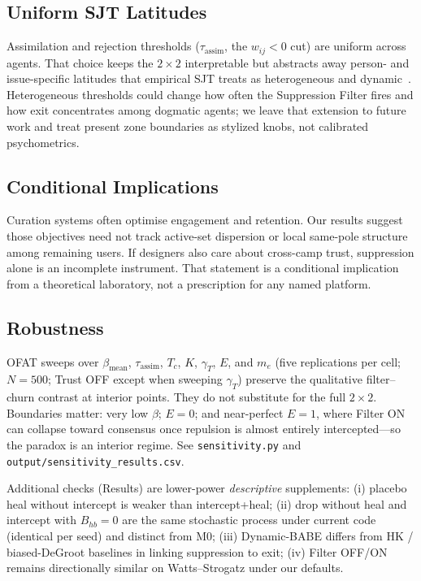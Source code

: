 \subsection{Uniform SJT Latitudes}
Assimilation and rejection thresholds ($\tau_{\mathrm{assim}}$, the $w_{ij}<0$ cut) are uniform across agents. That choice keeps the $2\times2$ interpretable but abstracts away person- and issue-specific latitudes that empirical SJT treats as heterogeneous and dynamic~\citep{Sherif1961}. Heterogeneous thresholds could change how often the Suppression Filter fires and how exit concentrates among dogmatic agents; we leave that extension to future work and treat present zone boundaries as stylized knobs, not calibrated psychometrics.

\subsection{Conditional Implications}
Curation systems often optimise engagement and retention. Our results suggest those objectives need not track active-set dispersion or local same-pole structure among remaining users. If designers also care about cross-camp trust, suppression alone is an incomplete instrument. That statement is a conditional implication from a theoretical laboratory, not a prescription for any named platform.

\subsection{Robustness}
OFAT sweeps over $\beta_{\mathrm{mean}}$, $\tau_{\mathrm{assim}}$, $T_c$, $K$, $\gamma_T$, $E$, and $m_e$ (five replications per cell; $N=500$; Trust OFF except when sweeping $\gamma_T$) preserve the qualitative filter--churn contrast at interior points. They do not substitute for the full $2\times2$. Boundaries matter: very low $\beta$; $E=0$; and near-perfect $E=1$, where Filter ON can collapse toward consensus once repulsion is almost entirely intercepted---so the paradox is an interior regime. See \texttt{sensitivity.py} and \texttt{output/sensitivity\_results.csv}.

Additional checks (Results) are lower-power \emph{descriptive} supplements: (i) placebo heal without intercept is weaker than intercept+heal; (ii) drop without heal and intercept with $B_{hb}=0$ are the same stochastic process under current code (identical per seed) and distinct from M0; (iii) Dynamic-BABE differs from HK / biased-DeGroot baselines in linking suppression to exit; (iv) Filter OFF/ON remains directionally similar on Watts--Strogatz under our defaults.

